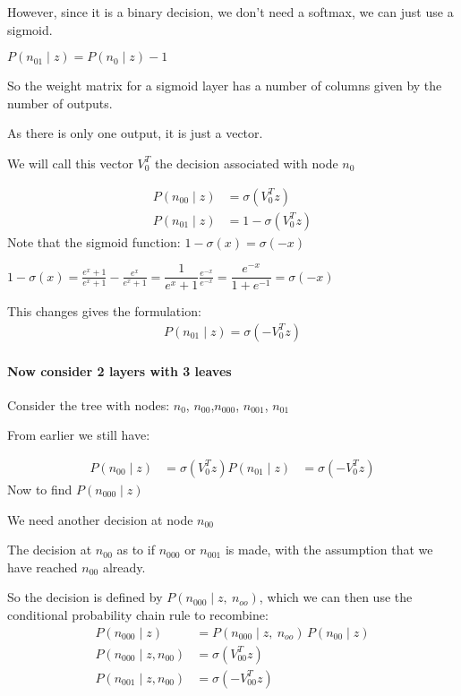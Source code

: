 \documentclass[parskip]{komatufte}
\begin{document}
However, since it is a binary decision, we don't need a softmax, we
can just use a sigmoid.

$P(n_{01}\mid z)=P(n_{0}\mid z)-1$

So the weight matrix for a sigmoid layer has a number of columns given
by the number of outputs.

As there is only one output, it is just a vector.

We will call this vector $V_{0}^{T}$ the decision
associated with node $n_{0}$

\begin{align}
P(n_{00}\mid z) &=\sigma(V_{0}^{T}z) \\
P(n_{01}\mid z) &=1-\sigma(V_{0}^{T}z)
\end{align}
Note that the sigmoid function: $1-\sigma(x)=\sigma(-x)$

$1-\sigma(x)=\frac{e^{x}+1}{e^{x}+1}-\frac{e^{x}}{e^{x}+1}=\dfrac{1}{e^{x}+1}\frac{e^{-x}}{e^{-x}}=\dfrac{e^{-x}}{1+e^{-1}}=\sigma(-x)$

This changes gives the formulation:
\begin{align}
P(n_{01}\mid z)=\sigma(-V_{0}^{T}z)
\end{align}


\paragraph{Now consider 2 layers with 3 leaves}

Consider the tree with nodes: $n_{0}$, $n_{00}$,$n_{000}$, $n_{001}$, $n_{01}$


From earlier we still have:

\begin{align}
P(n_{00}\mid z)&=\sigma(V_{0}^{T}z)
P(n_{01}\mid z)&=\sigma(-V_{0}^{T}z)
\end{align}
Now to find $P(n_{000}\mid z)$

We need another decision at node $n_{00}$

The decision at $n_{00}$ as to if $n_{000}$ or $n_{001}$ is made,
with the assumption that we have reached $n_{00}$ already.

So the decision is defined by $P(n_{000}\mid z,\:n_{oo})$,
which we can then use the conditional probability chain rule to recombine:
\begin{align}
P(n_{000}\mid z)&=P(n_{000}\mid z,\:n_{oo})\,P(n_{00}\mid z) \\
P(n_{000}\mid z,n_{00})&=\sigma(V_{00}^{T}z) \\
P(n_{001}\mid z,n_{00})&=\sigma(-V_{00}^{T}z) \\
\end{align}
\end{document}
